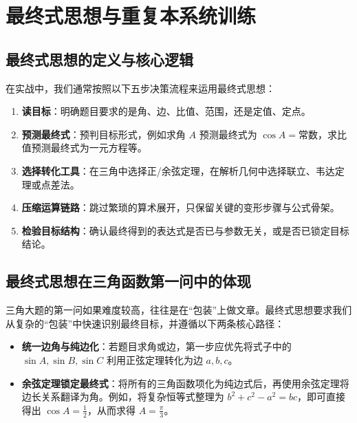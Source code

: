 \documentclass[11pt,a4paper]{ctexart}
\begin{document}
\section{最终式思想与重复本系统训练}

\subsection{最终式思想的定义与核心逻辑}


在实战中，我们通常按照以下五步决策流程来运用最终式思想：
\begin{enumerate}
  \item \textbf{读目标}：明确题目要求的是角、边、比值、范围，还是定值、定点。
  \item \textbf{预测最终式}：预判目标形式，例如求角 $A$ 预测最终式为 $\cos A = \text{常数}$，求比值预测最终式为一元方程等。
  \item \textbf{选择转化工具}：在三角中选择正/余弦定理，在解析几何中选择联立、韦达定理或点差法。
  \item \textbf{压缩运算链路}：跳过繁琐的算术展开，只保留关键的变形步骤与公式骨架。
  \item \textbf{检验目标结构}：确认最终得到的表达式是否已与参数无关，或是否已锁定目标结论。
\end{enumerate}

\subsection{最终式思想在三角函数第一问中的体现}

三角大题的第一问如果难度较高，往往是在“包装”上做文章。最终式思想要求我们从复杂的“包装”中快速识别最终目标，并遵循以下两条核心路径：
\begin{itemize}
  \item \textbf{统一边角与纯边化}：若题目求角或边，第一步应优先将式子中的 $\sin A, \sin B, \sin C$ 利用正弦定理转化为边 $a, b, c$。
  \item \textbf{余弦定理锁定最终式}：将所有的三角函数项化为纯边式后，再使用余弦定理将边长关系翻译为角。例如，将复杂恒等式整理为 $b^2+c^2-a^2 = bc$，即可直接得出 $\cos A = \frac{1}{2}$，从而求得 $A = \frac{\pi}{3}$。
\end{itemize}
\end{document}
